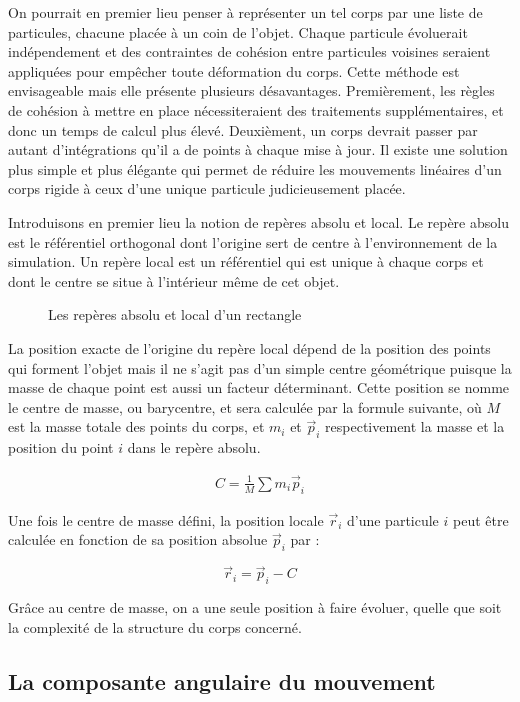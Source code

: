 On pourrait en premier lieu penser à représenter un tel corps par une
liste de particules, chacune placée à un coin de l'objet. Chaque
particule évoluerait indépendement et des contraintes de cohésion
entre particules voisines seraient appliquées pour empêcher toute
déformation du corps. Cette méthode est envisageable mais elle
présente plusieurs désavantages. Premièrement, les règles de cohésion
à mettre en place nécessiteraient des traitements supplémentaires, et
donc un temps de calcul plus élevé. Deuxièment, un corps devrait
passer par autant d'intégrations qu'il a de points à chaque mise à
jour. Il existe une solution plus simple et plus élégante qui permet
de réduire les mouvements linéaires d'un corps rigide à ceux d'une
unique particule judicieusement placée.

Introduisons en premier lieu la notion de repères absolu et local. Le
repère absolu est le référentiel orthogonal dont l'origine sert de
centre à l'environnement de la simulation. Un repère local est un
référentiel qui est unique à chaque corps et dont le centre se situe à
l'intérieur même de cet objet.

\begin{figure}
  \centering
  
  \caption{Les repères absolu et local d'un rectangle}
  \label{reperelocal}
\end{figure}

La position exacte de l'origine du repère local dépend de la position
des points qui forment l'objet mais il ne s'agit pas d'un simple
centre géométrique puisque la masse de chaque point est aussi un
facteur déterminant. Cette position se nomme le centre de masse, ou
barycentre, et sera calculée par la formule suivante, o\`u $M$ est la
masse totale des points du corps, et $m_i$ et $\vec{p}_i$
respectivement la masse et la position du point $i$ dans le repère
absolu.

\begin{align*}
  C = \frac{1}{M} \sum m_i \vec{p}_i
\end{align*}

Une fois le centre de masse défini, la position locale $\vec{r}_i$
d'une particule $i$ peut être calculée en fonction de sa position
absolue $\vec{p}_i$ par :

\[\vec{r}_i = \vec{p}_i - C\]

Grâce au centre de masse, on a une seule position à faire évoluer,
quelle que soit la complexité de la structure du corps concerné.

\subsection{La composante angulaire du mouvement}

